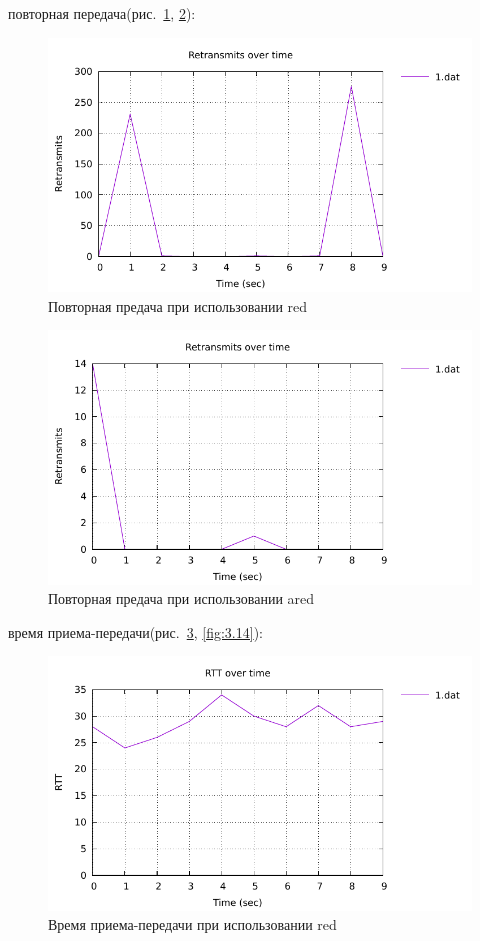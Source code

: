 повторная передача(рис.~\ref{fig:3.11}, \ref{fig:3.12}):

\begin{figure}[!ht]
  \centering
  \includegraphics[width=0.6\linewidth]{image/mininet_red/retransmits.pdf}
  \caption{Повторная предача при использовании red}
  \label{fig:3.11}
\end{figure}

\begin{figure}[!ht]
  \centering
  \includegraphics[width=0.6\linewidth]{image/mininet_ared/retransmits.pdf}
  \caption{Повторная предача при использовании ared}
  \label{fig:3.12}
\end{figure}

время приема-передачи(рис.~\ref{fig:3.13}, \ref{fig:3.14}):

\begin{figure}[!ht]
  \centering
  \includegraphics[width=0.6\linewidth]{image/mininet_red/RTT.pdf}
  \caption{Время приема-передачи при использовании red}
  \label{fig:3.13}
\end{figure}

